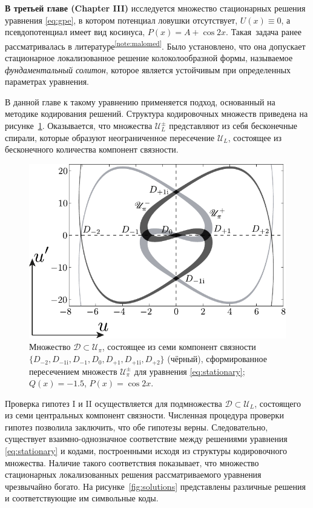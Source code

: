 \documentclass[candidate, href, colorlinks]{disser}
\begin{document}
\textbf{В третьей главе (Chapter III)} исследуется множество стационарных решения уравнения \eqref{eq:gpe}, в котором потенциал ловушки отсутствует, $U(x) \equiv 0$, а псевдопотенциал имеет вид косинуса, $P(x) = A + \cos 2x$.
Такая задача ранее рассматривалась в литературе\textsuperscript{\ref{note:malomed}}.
Было установлено, что она допускает стационарное локализованное решение колоколообразной формы, называемое {\it фундаментальный солитон}, которое является устойчивым при определенных параметрах уравнения.

В данной главе к такому уравнению применяется подход, основанный на методике кодирования решений.
Структура кодировочных множеств приведена на рисунке~\ref{fig:island-set}.
Оказывается, что множества $\mathscr{U}_L^{\pm}$ представляют из себя бесконечные спирали, которые образуют неограниченное пересечение $\mathscr{U}_L$, состоящее из бесконечного количества компонент связности.

\begin{figure}[h]
\centering
	\includegraphics[scale = 1]{../pic/island set to check hypotheses for cosine equation}
	\caption{
		Множество $\mathcal{D} \subset \mathscr{U}_{\pi}$, состоящее из семи компонент связности $\{ D_{-2}, D_{-1\mathrm{i}}, D_{-1}, D_0, D_{+1}, D_{+1\mathrm{i}}, D_{+2} \}$ (чёрный), сформированное пересечением множеств $\mathscr{U}_{\pi}^{\pm}$ для уравнения \eqref{eq:stationary}; $Q(x) = -1.5$, $P(x) = \cos 2x$.
	}
\label{fig:island-set}
\end{figure}

Проверка гипотез I и II осуществляется для подмножества $\mathcal{D} \subset \mathscr{U}_L$, состоящего из семи центральных компонент связности.
Численная процедура проверки гипотез позволила заключить, что обе гипотезы верны.
Следовательно, существует взаимно-однозначное соответствие между решениями уравнения \eqref{eq:stationary} и кодами, построенными исходя из структуры кодировочного множества.
Наличие такого соответствия показывает, что множество стационарных локализованных решения рассматриваемого уравнения чрезвычайно богато.
На рисунке~\ref{fig:solutions} представлены различные решения и соответствующие им символьные коды.
\end{document}
